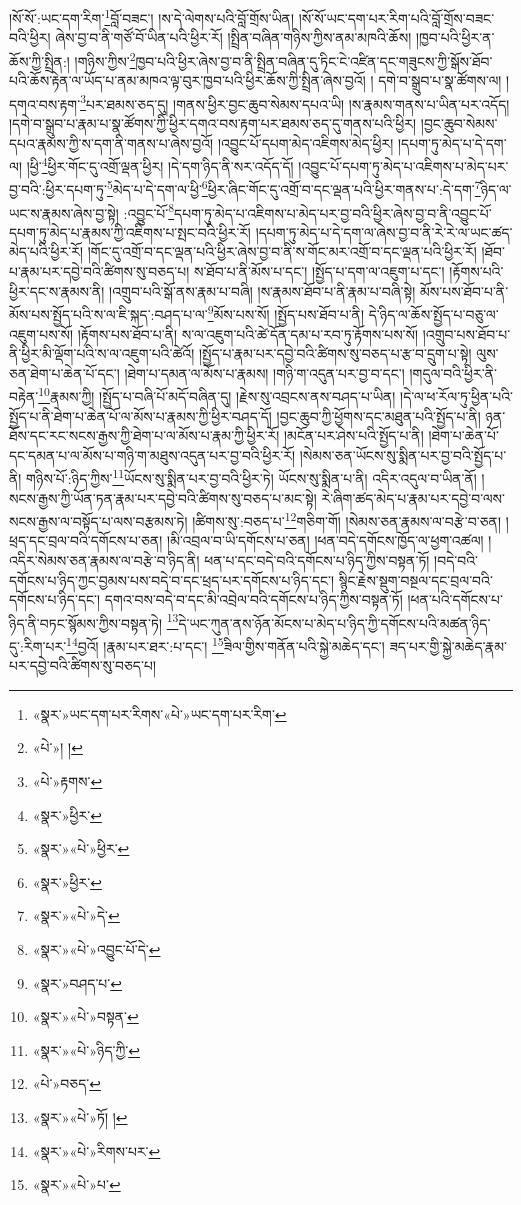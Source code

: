 །སོ་སོ་:ཡང་དག་རིག་\footnote{«སྣར་»ཡང་དག་པར་རིགས་«པེ་»ཡང་དག་པར་རིག་}བློ་བཟང་། །ས་དེ་ལེགས་པའི་བློ་གྲོས་ཡིན། །སོ་སོ་ཡང་དག་པར་རིག་པའི་བློ་གྲོས་བཟང་བའི་ཕྱིར། ཞེས་བྱ་བ་ནི་གཙོ་བོ་ཡིན་པའི་ཕྱིར་རོ། །སྤྲིན་བཞིན་གཉིས་ཀྱིས་ནམ་མཁའི་ཆོས། །ཁྱབ་པའི་ཕྱིར་ན་ཆོས་ཀྱི་སྤྲིན:། །གཉིས་ཀྱིས་\footnote{«པེ་»། །}ཁྱབ་པའི་ཕྱིར་ཞེས་བྱ་བ་ནི་སྤྲིན་བཞིན་དུ་ཏིང་ངེ་འཛིན་དང་གཟུངས་ཀྱི་སྒོས་ཐོབ་པའི་ཆོས་རྟེན་ལ་ཡོད་པ་ནམ་མཁའ་ལྟ་བུར་ཁྱབ་པའི་ཕྱིར་ཆོས་ཀྱི་སྤྲིན་ཞེས་བྱའོ། །
དགེ་བ་སྒྲུབ་པ་སྣ་ཚོགས་ལ། །དགའ་བས་རྟག་\footnote{«པེ་»རྟགས་}པར་ཐམས་ཅད་དུ། །གནས་ཕྱིར་བྱང་ཆུབ་སེམས་དཔའ་ཡི། །ས་རྣམས་གནས་པ་ཡིན་པར་འདོད། །དགེ་བ་སྒྲུབ་པ་རྣམ་པ་སྣ་ཚོགས་ཀྱི་ཕྱིར་དགའ་བས་རྟག་པར་ཐམས་ཅད་དུ་གནས་པའི་ཕྱིར། །བྱང་ཆུབ་སེམས་དཔའ་རྣམས་ཀྱི་ས་དག་ནི་གནས་པ་ཞེས་བྱའོ། །འབྱུང་པོ་དཔག་མེད་འཇིགས་མེད་ཕྱིར། །དཔག་ཏུ་མེད་པ་དེ་དག་ལ། །ཕྱི་\footnote{«སྣར་»ཕྱིར་}ཕྱིར་གོང་དུ་འགྲོ་ལྡན་ཕྱིར། །དེ་དག་ཉིད་ནི་སར་འདོད་དོ། །འབྱུང་པོ་དཔག་ཏུ་མེད་པ་འཇིགས་པ་མེད་པར་བྱ་བའི་:ཕྱིར་དཔག་ཏུ་\footnote{«སྣར་»«པེ་»ཕྱིར་}མེད་པ་དེ་དག་ལ་ཕྱི་\footnote{«སྣར་»ཕྱིར་}ཕྱིར་ཞིང་གོང་དུ་འགྲོ་བ་དང་ལྡན་པའི་ཕྱིར་གནས་པ་:དེ་དག་\footnote{«སྣར་»«པེ་»དེ་}ཉིད་ལ་ཡང་ས་རྣམས་ཞེས་བྱ་སྟེ། :འབྱུང་པོ་\footnote{«སྣར་»«པེ་»འབྱུང་པོ་དེ་}དཔག་ཏུ་མེད་པ་འཇིགས་པ་མེད་པར་བྱ་བའི་ཕྱིར་ཞེས་བྱ་བ་ནི་འབྱུང་པོ་དཔག་ཏུ་མེད་པ་རྣམས་ཀྱི་འཇིགས་པ་སྤང་བའི་ཕྱིར་རོ། །དཔག་ཏུ་མེད་པ་དེ་དག་ལ་ཞེས་བྱ་བ་ནི་རེ་རེ་ལ་ཡང་ཚད་མེད་པའི་ཕྱིར་རོ། །གོང་དུ་འགྲོ་བ་དང་ལྡན་པའི་ཕྱིར་ཞེས་བྱ་བ་ནི་ས་གོང་མར་འགྲོ་བ་དང་ལྡན་པའི་ཕྱིར་རོ། །ཐོབ་པ་རྣམ་པར་དབྱེ་བའི་ཚིགས་སུ་བཅད་པ། ས་ཐོབ་པ་ནི་མོས་པ་དང་། །སྤྱོད་པ་དག་ལ་འཇུག་པ་དང་། །རྟོགས་པའི་ཕྱིར་དང་ས་རྣམས་ནི། །འགྲུབ་པའི་སྒོ་ནས་རྣམ་པ་བཞི། །ས་རྣམས་ཐོབ་པ་ནི་རྣམ་པ་བཞི་སྟེ། མོས་པས་ཐོབ་པ་ནི་མོས་པས་སྤྱོད་པའི་ས་ལ་ཇི་སྐད་:བཤད་པ་ལ་\footnote{«སྣར་»བཤད་པ་}མོས་པས་སོ། །སྤྱོད་པས་ཐོབ་པ་ནི། དེ་ཉིད་ལ་ཆོས་སྤྱོད་པ་བཅུ་ལ་འཇུག་པས་སོ། །རྟོགས་པས་ཐོབ་པ་ནི། ས་ལ་འཇུག་པའི་ཚེ་དོན་དམ་པ་རབ་ཏུ་རྟོགས་པས་སོ། །འགྲུབ་པས་ཐོབ་པ་ནི་ཕྱིར་མི་ལྡོག་པའི་ས་ལ་འཇུག་པའི་ཚེའོ། །སྤྱོད་པ་རྣམ་པར་དབྱེ་བའི་ཚིགས་སུ་བཅད་པ་རྩ་བ་དྲུག་པ་སྟེ། ལུས་ཅན་ཐེག་པ་ཆེན་པོ་དང་། །ཐེག་པ་དམན་ལ་མོས་པ་རྣམས། །གཉི་ག་འདུན་པར་བྱ་བ་དང་། །གདུལ་བའི་ཕྱིར་ནི་བརྟེན་\footnote{«སྣར་»«པེ་»བསྟན་}རྣམས་ཀྱི། །སྤྱོད་པ་བཞི་པོ་མདོ་བཞིན་དུ། །རྗེས་སུ་འབྲངས་ནས་བཤད་པ་ཡིན། །དེ་ལ་ཕ་རོལ་ཏུ་ཕྱིན་པའི་སྤྱོད་པ་ནི་ཐེག་པ་ཆེན་པོ་ལ་མོས་པ་རྣམས་ཀྱི་ཕྱིར་བཤད་དོ། །བྱང་ཆུབ་ཀྱི་ཕྱོགས་དང་མཐུན་པའི་སྤྱོད་པ་ནི། ཉན་ཐོས་དང་རང་སངས་རྒྱས་ཀྱི་ཐེག་པ་ལ་མོས་པ་རྣམ་ཀྱི་ཕྱིར་རོ། །མངོན་པར་ཤེས་པའི་སྤྱོད་པ་ནི། །ཐེག་པ་ཆེན་པོ་དང་དམན་པ་ལ་མོས་པ་གཉི་ག་མཐུས་འདུན་པར་བྱ་བའི་ཕྱིར་རོ། །སེམས་ཅན་ཡོངས་སུ་སྨིན་པར་བྱ་བའི་སྤྱོད་པ་ནི། གཉིས་པོ་:ཉིད་ཀྱིས་\footnote{«སྣར་»«པེ་»ཉིད་ཀྱི་}ཡོངས་སུ་སྨིན་པར་བྱ་བའི་ཕྱིར་ཏེ། ཡོངས་སུ་སྨིན་པ་ནི། འདིར་འདུལ་བ་ཡིན་ནོ། །སངས་རྒྱས་ཀྱི་ཡོན་ཏན་རྣམ་པར་དབྱེ་བའི་ཚིགས་སུ་བཅད་པ་མང་སྟེ། རེ་ཞིག་ཚད་མེད་པ་རྣམ་པར་དབྱེ་བ་ལས་སངས་རྒྱས་ལ་བསྟོད་པ་ལས་བརྩམས་ཏེ། །ཚིགས་སུ་:བཅད་པ་\footnote{«པེ་»བཅད་}གཅིག་གོ། །སེམས་ཅན་རྣམས་ལ་བརྩེ་བ་ཅན། །ཕྲད་དང་བྲལ་བའི་དགོངས་པ་ཅན། །མི་འབྲལ་བ་ཡི་དགོངས་པ་ཅན། །ཕན་བདེ་དགོངས་ཁྱོད་ལ་ཕྱག་འཚལ། །འདིར་སེམས་ཅན་རྣམས་ལ་བརྩེ་བ་ཉིད་ནི། ཕན་པ་དང་བདེ་བའི་དགོངས་པ་ཉིད་ཀྱིས་བསྟན་ཏོ། །བདེ་བའི་དགོངས་པ་ཉིད་ཀྱང་བྱམས་པས་བདེ་བ་དང་ཕྲད་པར་དགོངས་པ་ཉིད་དང་། སྙིང་རྗེས་སྡུག་བསྔལ་དང་བྲལ་བའི་དགོངས་པ་ཉིད་དང་། དགའ་བས་བདེ་བ་དང་མི་འབྲེལ་བའི་དགོངས་པ་ཉིད་ཀྱིས་བསྟན་ཏོ། །ཕན་པའི་དགོངས་པ་ཉིད་ནི་བཏང་སྙོམས་ཀྱིས་བསྟན་ཏེ། \footnote{«སྣར་»«པེ་»ཏོ། ། }དེ་ཡང་ཀུན་ནས་ཉོན་མོངས་པ་མེད་པ་ཉིད་ཀྱི་དགོངས་པའི་མཚན་ཉིད་དུ་:རིག་པར་\footnote{«སྣར་»«པེ་»རིགས་པར་}བྱའོ། །རྣམ་པར་ཐར་:པ་དང་། \footnote{«སྣར་»«པེ་»པ་}ཟིལ་གྱིས་གནོན་པའི་སྐྱེ་མཆེད་དང་། ཟད་པར་གྱི་སྐྱེ་མཆེད་རྣམ་པར་དབྱེ་བའི་ཚིགས་སུ་བཅད་པ། 